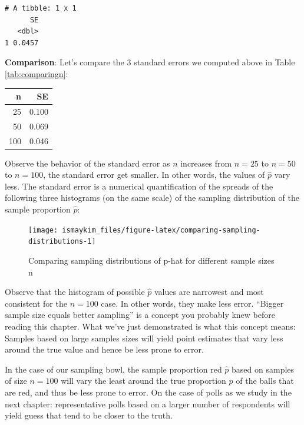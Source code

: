 \documentclass[12pt,]{krantz}
\theoremstyle{definition}
\theoremstyle{definition}
\theoremstyle{definition}
\theoremstyle{remark}
\begin{document}
\begin{verbatim}
# A tibble: 1 x 1
      SE
   <dbl>
1 0.0457
\end{verbatim}

\textbf{Comparison}: Let's compare the 3 standard errors we computed
above in Table \ref{tab:comparingn}:

\begin{table}[H]
\centering\begingroup\fontsize{10}{12}\selectfont

\begin{tabular}{rr}
\toprule
n & SE\\
\midrule
25 & 0.100\\
50 & 0.069\\
100 & 0.046\\
\bottomrule
\end{tabular}
\endgroup{}
\end{table}

Observe the behavior of the standard error as \(n\) increases from
\(n=25\) to \(n=50\) to \(n=100\), the standard error get smaller. In
other words, the values of \(\widehat{p}\) vary less. The standard error
is a numerical quantification of the spreads of the following three
histograms (on the same scale) of the sampling distribution of the
sample proportion \(\widehat{p}\):

\begin{figure}

{\centering \texttt{[image: ismaykim\_files/figure-latex/comparing-sampling-distributions-1]} 

}

\caption{Comparing sampling distributions of p-hat for different sample sizes n}\label{fig:comparing-sampling-distributions}
\end{figure}

Observe that the histogram of possible \(\widehat{p}\) values are
narrowest and most consistent for the \(n=100\) case. In other words,
they make less error. ``Bigger sample size equals better sampling'' is a
concept you probably knew before reading this chapter. What we've just
demonstrated is what this concept means: Samples based on large samples
sizes will yield point estimates that vary less around the true value
and hence be less prone to error.

In the case of our sampling bowl, the sample proportion red
\(\widehat{p}\) based on samples of size \(n=100\) will vary the least
around the true proportion \(p\) of the balls that are red, and thus be
less prone to error. On the case of polls as we study in the next
chapter: representative polls based on a larger number of respondents
will yield guess that tend to be closer to the truth.
\end{document}
